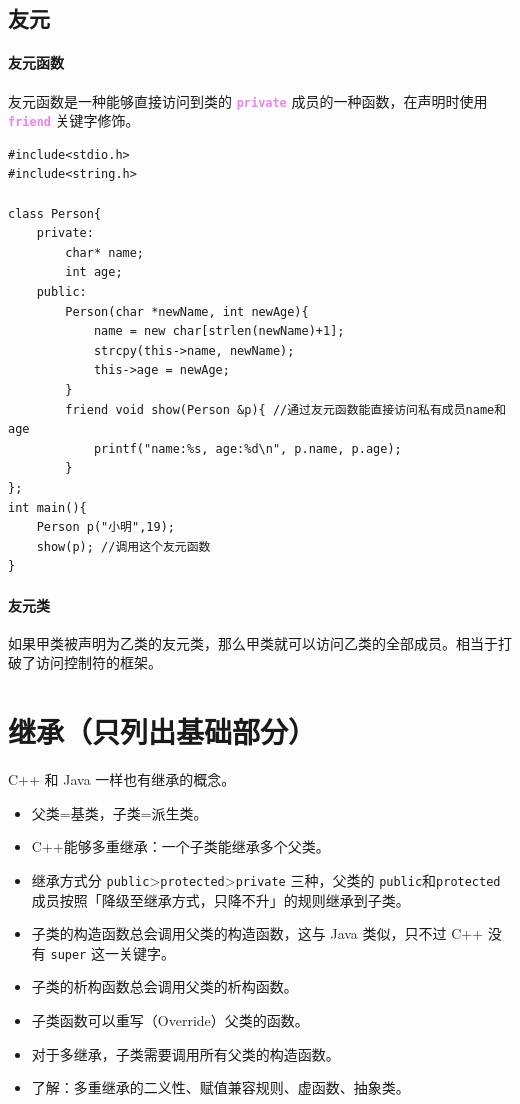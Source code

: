 \documentclass[UTF8]{ctexart}
\newcommand\Emph[1]{\colorbox{green!10}{\textcolor{green!30!black}{#1}}}
\newcommand\keyword[1]{\textcolor{violet}{\textbf{\texttt{#1}}}}
\begin{document}
\subsection{友元}
\paragraph{友元函数} 友元函数是一种能够直接访问到类的 \keyword{private} 成员的一种函数，在声明时使用 \keyword{friend} 关键字修饰。

\begin{lstlisting}
#include<stdio.h>
#include<string.h>

class Person{
	private:
		char* name;
		int age;
	public:
		Person(char *newName, int newAge){
			name = new char[strlen(newName)+1];
			strcpy(this->name, newName);
			this->age = newAge;
		}
		friend void show(Person &p){ //通过友元函数能直接访问私有成员name和age
			printf("name:%s, age:%d\n", p.name, p.age);
		}
};
int main(){
	Person p("小明",19);
	show(p); //调用这个友元函数
}
\end{lstlisting}

\paragraph{友元类} 如果甲类被声明为乙类的友元类，那么甲类就可以访问乙类的全部成员。相当于打破了访问控制符的框架。

\section{继承（只列出基础部分）}
C++ 和 Java 一样也有继承的概念。

\begin{itemize}[itemsep=0pt,parsep=0pt]
  \item 父类=基类，子类=派生类。
  \item C++\Emph{能够多重继承}：一个子类能继承多个父类。
  \item 继承方式分 \verb!public!>\verb!protected!>\verb!private! 三种，父类的 \verb!public!和\verb!protected! 成员按照「降级至继承方式，只降不升」的规则继承到子类。
  \item 子类的构造函数总会调用父类的构造函数，这与 Java 类似，只不过 C++ 没有 \verb!super! 这一关键字。
  \item 子类的析构函数总会调用父类的析构函数。
  \item 子类函数可以重写（Override）父类的函数。
  \item 对于多继承，子类需要调用所有父类的构造函数。
  \item 了解：多重继承的二义性、赋值兼容规则、虚函数、抽象类。
\end{itemize}
\end{document}
